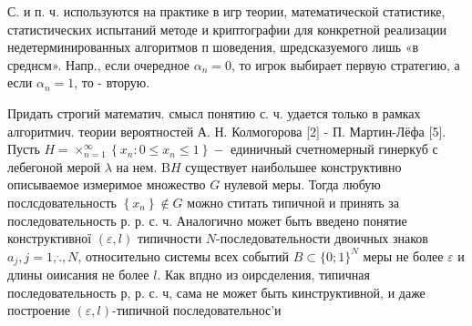 \documentclass[10pt]{article}
\begin{document}
С. и п. ч. используются на практике в игр теории, математической статистике, статистических испытаний методе и криптографии для конкретной реализации недетерминированных алгоритмов п шоведения, шредсказуемого лишь «в среднсм». Напр., если очередное $\alpha_{n}=0$, то игрок выбирает первую стратегию, а если $\alpha_{n}=1$, то - вторую.



Придать строгий математич. смысл понятию с. ч. удается только в рамках алгоритмич. теории вероятностей А. Н. Колмогорова [2] - П. Мартин-Лёфа [5]. Пусть $H=\times_{n=1}^{\infty}\left\{x_{n}: 0 \leqslant x_{n} \leqslant 1\right\}-$ единичный счетномерный гинеркуб с лебегоной мерой $\lambda$ на нем. $\mathrm{B} H$ существует наибольшее конструктивно описываемое измеримое множество $G$ нулевой меры. Тогда любую послсдовательность $\left\{x_{n}\right\} \notin G$ можно ститать типичноӥ и принять за последовательность р. р. с. ч. Аналогично может быть введено понятие конструктивної $(\varepsilon, l)$ типичности $N$-последовательности двоичных знаков $a_{j}, j=1, \dot{.}, N$, относительно системы всех событий $B \subset\{0 ; 1\}^{N}$ меры не более $\varepsilon$ и длины оиисания не более $l$. Как впдно из оирсделения, типичная последовательность р, р. с. ч, сама не может быть кинструктивной, и даже построение $(\varepsilon, l)$-типичной последовательнос'и
\end{document}
